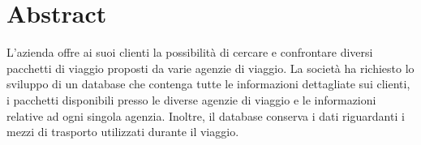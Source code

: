 \section{Abstract}
L'azienda \company offre ai suoi clienti la possibilità di cercare e confrontare diversi pacchetti di viaggio proposti da varie agenzie di viaggio. La società ha richiesto lo sviluppo di un database che contenga tutte le informazioni dettagliate sui clienti, i pacchetti disponibili presso le diverse agenzie di viaggio e le informazioni relative ad ogni singola agenzia. Inoltre, il database conserva i dati riguardanti i mezzi di trasporto utilizzati durante il viaggio.